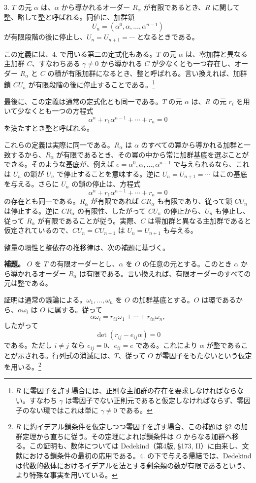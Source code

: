 \documentclass[11pt]{article}
\begin{document}
3. $T$ の元 $\alpha$ は、$\alpha$ から導かれるオーダー $R_\alpha$ が有限であるとき、$R$ に関して整、略して整と呼ばれる。同値に、加群鎖
\[
        U_n=(\alpha^0,\alpha,\ldots,\alpha^{n-1})
\]
が有限段階の後に停止し、$U_n=U_{n+1}=\cdots$ となるときである。

この定義には、4. で用いる第二の定式化もある。$T$ の元 $\alpha$ は、零加群と異なる主加群 $C$、すなわちある $\gamma\ne0$ から導かれる $C$ が少なくとも一つ存在し、オーダー $R_\alpha$ と $C$ の積が有限加群になるとき、整と呼ばれる。言い換えれば、加群鎖 $CU_n$ が有限段階の後に停止することである。\footnote{$R$ に零因子を許す場合には、正則な主加群の存在を要求しなければならない。すなわち $\gamma$ は零因子でない正則元であると仮定しなければならず、零因子のない環ではこれは単に $\gamma\ne0$ である。}

最後に、この定義は通常の定式化とも同一である。$T$ の元 $\alpha$ は、$R$ の元 $r_i$ を用いて少なくとも一つの方程式
\[
        \alpha^n+r_1\alpha^{n-1}+\cdots+r_n=0
\]
を満たすとき整と呼ばれる。

これらの定義は実際に同一である。$R_\alpha$ は $\alpha$ のすべての冪から導かれる加群と一致するから、$R_\alpha$ が有限であるとき、その冪の中から常に加群基底を選ぶことができる。そのような基底が、例えば $e=\alpha^0,\alpha,\ldots,\alpha^{n-1}$ で与えられるなら、これは $U_n$ の鎖が $U_n$ で停止することを意味する。逆に $U_n=U_{n+1}=\cdots$ はこの基底を与える。さらに $U_n$ の鎖の停止は、方程式
\[
        \alpha^n+r_1\alpha^{n-1}+\cdots+r_n=0
\]
の存在とも同一である。$R_\alpha$ が有限であれば $CR_\alpha$ も有限であり、従って鎖 $CU_n$ は停止する。逆に $CR_\alpha$ の有限性、したがって $CU_n$ の停止から、$U_n$ も停止し、従って $R_\alpha$ が有限であることが従う。実際、$C$ は零加群と異なる主加群であると仮定されているので、$CU_n=CU_{n+1}$ は $U_n=U_{n+1}$ も与える。

整量の環性と整依存の推移律は、次の補題に基づく。

\medskip
\noindent\textbf{補題。} $O$ を $T$ の有限オーダーとし、$\alpha$ を $O$ の任意の元とする。このとき $\alpha$ から導かれるオーダー $R_\alpha$ は有限である。言い換えれば、有限オーダーのすべての元は整である。

証明は通常の議論による。$\omega_1,\ldots,\omega_n$ を $O$ の加群基底とする。$O$ は環であるから、$\alpha\omega_i$ は $O$ に属する。従って
\[
        \alpha\omega_i=r_{i1}\omega_1+\cdots+r_{in}\omega_n,
\]
したがって
\[
        \det(r_{ij}-e_{ij}\alpha)=0
\]
である。ただし $i\ne j$ なら $e_{ij}=0$、$e_{ii}=e$ である。これにより $\alpha$ が整であることが示される。行列式の消滅には、$T$、従って $O$ が零因子をもたないという仮定を用いる。\footnote{$R$ に約イデアル鎖条件を仮定しつつ零因子を許す場合、この補題は §2 の加群定理から直ちに従う。その定理によれば鎖条件は $O$ からなる加群へ移る。この証明も、数体については Dedekind（第4版, §173, II）に由来し、文献における鎖条件の最初の応用である。4. の下で与える帰結では、Dedekind は代数的数体におけるイデアルを法とする剰余類の数が有限であるという、より特殊な事実を用いている。}
\end{document}

